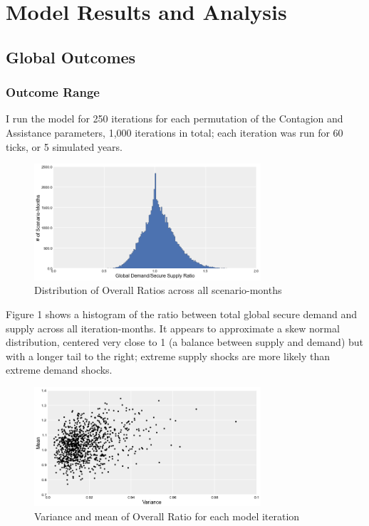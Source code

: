 \documentclass{llncs}
\begin{document}
\section{Model Results and Analysis}

\subsection{Global Outcomes}

\subsubsection{Outcome Range}

I run the model for 250 iterations for each permutation of the Contagion and Assistance parameters, 1,000 iterations in total; each iteration was run for 60 ticks, or 5 simulated years.

\begin{figure}[h!]
	\centering
	\includegraphics[width=0.75\textwidth]{../Graphics/OverallDistribution_lg}
	\caption{Distribution of Overall Ratios across all scenario-months}

\end{figure}

Figure 1 shows a histogram of the ratio between total global secure demand and supply across all iteration-months. It appears to approximate a skew normal distribution, centered very close to 1 (a balance between supply and demand) but with a longer tail to the right; extreme supply shocks are more likely than extreme demand shocks.

\begin{figure}[h!]
	\centering
	\includegraphics[width=0.75\textwidth]{../Graphics/OverallVarMeanScatter_lg}
	\caption{Variance and mean of Overall Ratio for each model iteration}
\end{figure}
\end{document}
